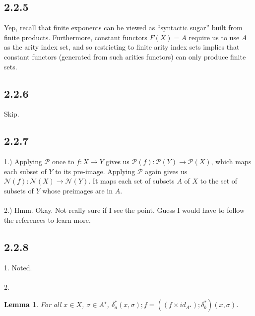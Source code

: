 \documentclass{article}
\newtheorem{lemma}{Lemma}
\begin{document}
\subsection*{2.2.5}

Yep, recall that finite exponents can be viewed as ``syntactic sugar'' built from finite products. Furthermore, 
constant functors $F(X) = A$ require us to use $A$ as the arity index set, and so restricting to finite arity index sets
implies that constant functors (generated from such arities functors) can only produce finite sets.   

\subsection*{2.2.6}

Skip.

\subsection*{2.2.7}

1.) Applying $\mathcal P$ once to $f : X \to Y$ gives us $\mathcal P(f) : \mathcal P(Y) \to \mathcal P(X)$, which
maps each subset of $Y$ to its pre-image. Applying $\mathcal P$ again gives us 
$\mathcal N(f) : \mathcal N(X) \to \mathcal N(Y)$. It maps each set of subsets $A$ of $X$ to the set of subsets of $Y$ whose
preimages are in $A$.\\~\\
2.) Hmm. Okay. Not really sure if I see the point. Guess I would have to follow the references to learn more.

\subsection*{2.2.8}

\begin{center}
\end{center}
1. Noted.\\~\\
2. 

\begin{lemma}
For all $x \in X$, $\sigma \in A^{\star}$, $\delta_a^*(x,\sigma);f = ((f \times id_{A^\star});\delta_b^*)(x,\sigma)$.
\end{lemma}
\end{document}
